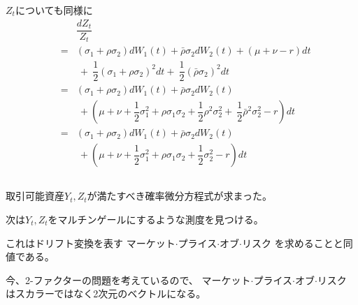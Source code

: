 \documentclass[uplatex,a4j,12pt,dvipdfmx]{jsarticle}
\begin{document}
$Z_{t}$についても同様に
%
%
\begin{eqnarray*}
	&&
	\dfrac{dZ_{t}}{Z_{t}}
	\\[2mm] &=&
	(\sigma_{1} + \rho \sigma_{2}) dW_{1}(t)
	+ \bar{\rho} \sigma_{2} dW_{2}(t)
	+ ( \mu + \nu - r ) dt
	\\ && \
	+ \
	\dfrac{1}{2} (\sigma_{1} + \rho \sigma_{2})^{2} dt
	+ \
	\dfrac{1}{2} (\bar{\rho} \sigma_{2})^{2} dt
	\\[2mm] &=&
	(\sigma_{1} + \rho \sigma_{2}) dW_{1}(t)
	+ \bar{\rho} \sigma_{2} dW_{2}(t)
	\\ && \ +
	\left(
	\mu + \nu +
	\dfrac{1}{2} \sigma_{1}^{2} + \rho \sigma_{1} \sigma_{2} + \dfrac{1}{2} \rho^{2} \sigma_{2}^{2}
	+ \
	\dfrac{1}{2} \bar{\rho}^{2} \sigma_{2}^{2}
	- r
	\right) dt
	\\[2mm] &=&
	(\sigma_{1} + \rho \sigma_{2}) dW_{1}(t)
	+ \bar{\rho} \sigma_{2} dW_{2}(t)
	\\ && \ +
	\left(
	\mu + \nu +
	\dfrac{1}{2} \sigma_{1}^{2} + \rho \sigma_{1} \sigma_{2} + \dfrac{1}{2} \sigma_{2}^{2}
	- r
	\right) dt
\end{eqnarray*}
%
%

${}$

取引可能資産$Y_{t},Z_{t}$が満たすべき確率微分方程式が求まった。

次は$Y_{t},Z_{t}$をマルチンゲールにするような測度を見つける。

これはドリフト変換を表す
マーケット$\cdot$プライス$\cdot$オブ$\cdot$リスク
を求めることと同値である。

今、2-ファクターの問題を考えているので、
マーケット$\cdot$プライス$\cdot$オブ$\cdot$リスク
はスカラーではなく2次元のベクトルになる。
\end{document}
